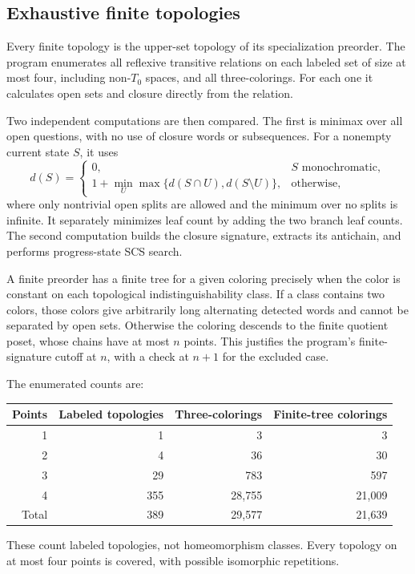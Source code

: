 \documentclass[11pt,letterpaper]{article}
\numberwithin{equation}{section}
\theoremstyle{definition}
\theoremstyle{remark}
\theoremstyle{definition}
\begin{document}
\subsection{Exhaustive finite topologies}

Every finite topology is the upper-set topology of its specialization
preorder. The program enumerates all reflexive transitive relations on each
labeled set of size at most four, including non-$T_0$ spaces, and all
three-colorings. For each one it calculates open sets and closure directly
from the relation.

Two independent computations are then compared. The first is minimax over
all open questions, with no use of closure words or subsequences. For a
nonempty current state $S$, it uses
\[
 d(S)=\begin{cases}
 0,&S\text{ monochromatic},\\
 1+\min_U\max\{d(S\cap U),d(S\setminus U)\},&\text{otherwise},
 \end{cases}
\]
where only nontrivial open splits are allowed and the minimum over no splits
is infinite. It separately minimizes leaf count by adding the two branch
leaf counts. The second computation builds the closure signature, extracts
its antichain, and performs progress-state SCS search.

A finite preorder has a finite tree for a given coloring precisely when the
color is constant on each topological indistinguishability class. If a class
contains two colors, those colors give arbitrarily long alternating detected
words and cannot be separated by open sets. Otherwise the coloring descends
to the finite quotient poset, whose chains have at most $n$ points. This
justifies the program's finite-signature cutoff at $n$, with a check at
$n+1$ for the excluded case.

The enumerated counts are:
\begin{center}
\begin{tabular}{@{}rrrr@{}}
\toprule
Points & Labeled topologies & Three-colorings & Finite-tree colorings\\
\midrule
1 & 1 & 3 & 3\\
2 & 4 & 36 & 30\\
3 & 29 & 783 & 597\\
4 & 355 & 28,755 & 21,009\\
\midrule
Total & 389 & 29,577 & 21,639\\
\bottomrule
\end{tabular}
\end{center}
These count labeled topologies, not homeomorphism classes. Every topology
on at most four points is covered, with possible isomorphic repetitions.
\end{document}
